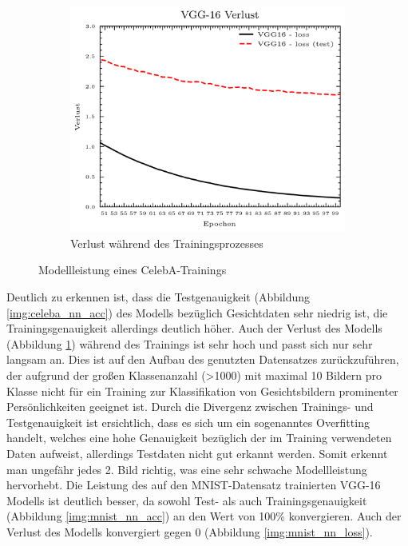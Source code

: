 \begin{figure}[H]
\begin{subfigure}[b]{0.35\linewidth}
		\includegraphics[width=\linewidth]{Bilder/celeba_nn_loss.png}
		\caption{Verlust während des Trainingsprozesses}
		\label{img:celeba_nn_loss}
	\end{subfigure}
	\caption{Modellleistung eines CelebA-Trainings}
	\label{img:celeba_training}
\end{figure}
 Deutlich zu erkennen ist, dass die Testgenauigkeit (Abbildung \ref{img:celeba_nn_acc}) des Modells bezüglich Gesichtdaten sehr niedrig ist, die Trainingsgenauigkeit allerdings deutlich höher. Auch der Verlust des Modells (Abbildung \ref{img:celeba_nn_loss}) während des Trainings ist sehr hoch und passt sich nur sehr langsam an. Dies ist auf den Aufbau des genutzten Datensatzes zurückzuführen, der aufgrund der großen Klassenanzahl (>1000) mit maximal 10 Bildern pro Klasse nicht für ein Training zur Klassifikation von Gesichtsbildern prominenter Persönlichkeiten geeignet ist. Durch die Divergenz zwischen Trainings- und Testgenauigkeit ist ersichtlich, dass es sich um ein sogenanntes Overfitting handelt, welches eine hohe Genauigkeit bezüglich der im Training verwendeten Daten aufweist, allerdings Testdaten nicht gut erkannt werden. Somit erkennt man ungefähr jedes 2. Bild richtig, was eine sehr schwache Modellleistung hervorhebt. Die Leistung des auf den MNIST-Datensatz trainierten VGG-16 Modells ist deutlich besser, da sowohl Test- als auch Trainingsgenauigkeit (Abbildung \ref{img:mnist_nn_acc}) an den Wert von 100\% konvergieren. Auch der Verlust des Modells konvergiert gegen 0 (Abbildung \ref{img:mnist_nn_loss}).

